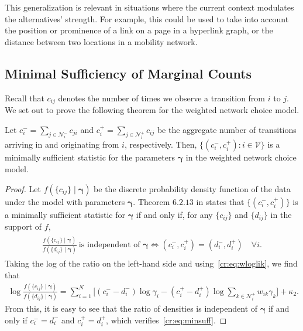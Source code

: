 This generalization is relevant in situations where the current context modulates the alternatives' strength.
For example, this could be used to take into account the position or prominence of a link on a page in a hyperlink graph, or the distance between two locations in a mobility network.


\subsection{Minimal Sufficiency of Marginal Counts}

Recall that $c_{ij}$ denotes the number of times we observe a transition from $i$ to $j$.
We set out to prove the following theorem for the weighted network choice model.

\begin{theorem}
Let $c^-_i = \sum_{j \in \mathcal{N}^-_i} c_{ji}$ and $c^+_i = \sum_{j \in \mathcal{N}^+_i} c_{ij}$ be the aggregate number of transitions arriving in and originating from $i$, respectively.
Then, $\{ (c^-_i, c^+_i) : i \in \mathcal{V} \}$ is a minimally sufficient statistic for the parameters $\bm{\gamma}$ in the weighted network choice model.
\end{theorem}

\begin{proof}
Let $f(\{ c_{ij} \} \mid \bm{\gamma})$ be the discrete probability density function of the data under the model with parameters $\bm{\gamma}$.
Theorem $6.2.13$ in \citet{casella2002statistical} states that $\{ (c^-_i, c^+_i) \}$ is a minimally sufficient statistic for $\bm{\gamma}$ if and only if, for any $\{ c_{ij} \}$ and $\{ d_{ij} \}$ in the support of $f$,
\begin{align}
\label{cr:eq:minsuff}
\begin{aligned}
\frac{ f(\{ c_{ij} \} \mid \bm{\gamma}) }{ f(\{ d_{ij} \} \mid \bm{\gamma}) }\ \text{is independent of $\bm{\gamma}$}
\iff (c^-_i, c^+_i) = (d^-_i, d^+_i) \quad \forall i.
\end{aligned}
\end{align}
Taking the log of the ratio on the left-hand side and using~\eqref{cr:eq:wloglik}, we find that
\begin{align*}
\log \frac{ f(\{ c_{ij} \} \mid \bm{\gamma}) }{ f(\{ d_{ij} \} \mid \bm{\gamma}) } =
  \sum_{i = 1}^N \bigg[ (c^-_i\!-\!d^-_i) \log \gamma_i
                       - (c^+_i\!-\!d^+_i) \log\!\sum_{k \in \mathcal{N}^+_i}\!w_{ik} \gamma_k \bigg] + \kappa_2.
\end{align*}
From this, it is easy to see that the ratio of densities is independent of $\bm{\gamma}$ if and only if $c^-_i = d^-_i$ and $c^+_i = d^+_i$, which verifies~\eqref{cr:eq:minsuff}.
\end{proof}

